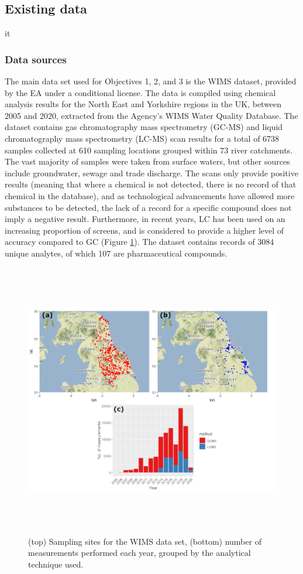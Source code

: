 \documentclass{article}
\begin{document}
\subsection{Existing data}
it\subsubsection{Data sources}
The main data set used for Objectives 1, 2, and 3 is the WIMS dataset, provided by the EA under a conditional license. The data is compiled using chemical analysis results for the North East and Yorkshire regions in the UK, between 2005 and 2020, extracted from the Agency’s WIMS Water Quality Database. The dataset contains gas chromatography mass spectrometry (GC-MS) and liquid chromatography mass spectrometry (LC-MS) scan results for a total of 6738 samples collected at 610 sampling locations grouped within 73 river catchments. The vast majority of samples were taken from surface waters, but other sources include groundwater, sewage and trade discharge. The scans only provide positive results (meaning that where a chemical is not detected, there is no record of that chemical in the database), and as technological advancements have allowed more substances to be detected, the lack of a record for a specific compound does not imply a negative result. Furthermore, in recent years, LC has been used on an increasing proportion of screens, and is considered to provide a higher level of accuracy compared to GC (Figure \ref{fig_hist_and_maps}). The dataset contains records of 3084 unique analytes, of which 107 are pharmaceutical compounds.

\begin{figure}[h]
    \centering
    \includegraphics[height=12cm]{fig_WIMS_by_method.png}
    \caption{(top) Sampling sites for the WIMS data set, (bottom) number of measurements performed each year, grouped by the analytical technique used.}
    \label{fig_hist_and_maps}
\end{figure}
\end{document}
